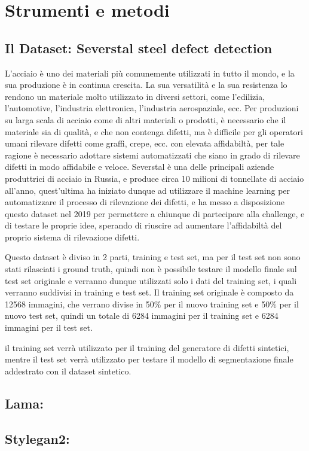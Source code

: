 \chapter{Strumenti e metodi\ok \ok \ok}

\section{Il Dataset: Severstal steel defect detection \ok}
\begin{comment}
dataset utilizzato per il progetto
\end{comment}
L'acciaio è uno dei materiali più comunemente utilizzati in tutto il mondo, e la sua produzione è in continua crescita.
La sua versatilità e la sua resistenza lo rendono un materiale molto utilizzato in diversi settori, come l'edilizia, l'automotive, l'industria elettronica, l'industria aerospaziale, ecc.
Per produzioni su larga scala di acciaio come di altri materiali o prodotti, è necessario che il materiale sia di qualità, e che non contenga difetti,
ma è difficile per gli operatori umani rilevare difetti come graffi, crepe, ecc. con elevata affidabiltà, per tale ragione 
è necessario adottare sistemi automatizzati che siano in grado di rilevare difetti in modo affidabile e veloce.
Severstal è una delle principali aziende produttrici di acciaio in Russia, e produce circa 10 milioni di tonnellate di acciaio all'anno,
quest'ultima ha iniziato dunque ad utilizzare il machine learning per automatizzare il processo di rilevazione dei difetti, e ha messo a disposizione
questo dataset nel 2019 per permettere a chiunque di partecipare alla challenge, e di testare le proprie idee, sperando di riuscire ad aumentare l'affidabiltà
del proprio sistema di rilevazione difetti.

Questo dataset è diviso in 2 parti, training e test set, ma per il test set non sono stati rilasciati i ground truth, quindi non è possibile testare
il modello finale sul test set originale e verranno dunque utilizzati solo i dati del training set, i quali verranno suddivisi in training e test set.
Il training set originale  è composto da 12568 immagini, che verrano divise in 50\% per il nuovo training set e 50\% per il nuovo test set, 
quindi un totale di 6284 immagini per il training set e 6284 immagini per il test set.

il training set verrà utilizzato per il training del generatore di difetti sintetici, mentre il test set verrà utilizzato per testare 
il modello di segmentazione finale addestrato con il dataset sintetico.


\section{Lama:  \ok}
\begin{comment}
Architettura base utilizzata per il modello.
\end{comment}


\section{Stylegan2:  \ok}
\begin{comment}
Architettura usata per generare le maskere sintetiche
e come componente del modello finale.
\end{comment}

